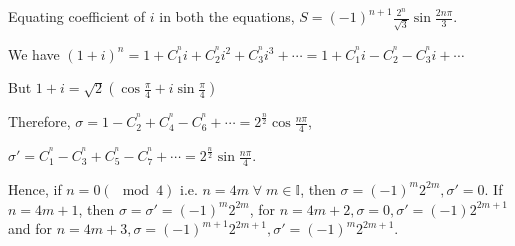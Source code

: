   Equating coefficient of $i$ in both the equations, $S = (-1)^{n +
    1}\frac{2^n}{\sqrt{3}}\sin\frac{2n\pi}{3}$.
\item We have $(1 + i)^n = 1 + C_1^^n i + C_2^^n i^2 + C_3^^n i^3 + \cdots = 1 + C_1^^n i - C_2^^n - C_3^^n
  i + \cdots$

  But $1 + i = \sqrt{2}\left(\cos\frac{\pi}{4} + i\sin\frac{\pi}{4}\right)$

  Therefore, $\sigma = 1 - C_2^^n + C_4^^n -C_6^^n + \cdots = 2^{\frac{n}{2}}\cos\frac{n\pi}{4}$,

  $\sigma' = C_1^^n - C_3^^n + C_5^^n - C_7^^n + \cdots = 2^{\frac{n}{2}}\sin\frac{n\pi}{4}$.

  Hence, if $n = 0(\mod 4)$ i.e. $n = 4m\;\forall\;m\in\mathbb{I}$, then $\sigma = (-1)^m2^{2m}, \sigma' =
  0$. If $n = 4m + 1$, then $\sigma = \sigma' = (-1)^m2^{2m}$, for $n = 4m + 2, \sigma = 0, \sigma' =
  (-1)2^{2m + 1}$ and for $n = 4m + 3, \sigma = (-1)^{m + 1}2^{2m + 1}, \sigma' = (-1)^m2^{2m + 1}$.

\stopitemize
